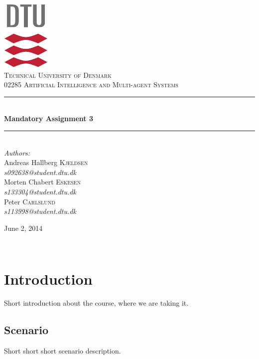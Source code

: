 \documentclass[11pt]{article}
\newcommand{\HRule}{\rule{\linewidth}{0.5mm}}
\begin{document}
\begin{titlepage}
\begin{center}

\includegraphics[scale=2.0]{../GFX/dtu_logo.pdf}\\[1cm]

\textsc{\LARGE Technical University of Denmark}\\[1.5cm]

\textsc{\Large 02285 Artificial Intelligence and Multi-agent Systems}\\[0.5cm]

\HRule \\[0.4cm]
{\huge \bfseries Mandatory Assignment 3}\\[0.1cm]
\HRule \\[1.5cm]

\large
\emph{Authors:}
\\[10pt]
Andreas Hallberg \textsc{Kjeldsen}\\
\emph{s092638@student.dtu.dk}
\\[10pt]
Morten Chabert \textsc{Eskesen}\\
\emph{s133304@student.dtu.dk}
\\[10pt]
Peter \textsc{Carlslund}\\
\emph{s113998@student.dtu.dk}

\vfill

{\large June 2, 2014}

\end{center}
\end{titlepage}

${}$
\vspace{-.55cm}

\tableofcontents
\clearpage

\section{Introduction}
Short introduction about the course, where we are taking it.

\subsection{Scenario}
Short short short scenario description.
\end{document}
